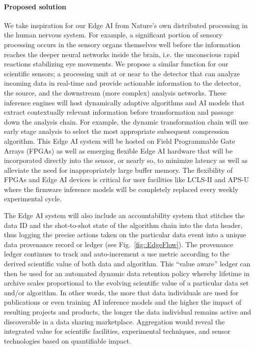 \documentclass{article}
\begin{document}
\paragraph{Proposed solution}%
We take inspiration for our Edge AI from Nature's own distributed processing in the human nervous system.
For example, a significant portion of sensory processing occurs in the sensory organs themselves well before the information reaches the deeper neural networks inside the brain, i.e. the unconscious rapid reactions stabilizing eye movements.
We propose a similar function for our scientific sensors; a processing unit at or near to the detector that can analyze incoming data in real-time and provide actionable information to the detector, the source, and the downstream (more complex) analysis networks.
These inference engines will host dynamically adaptive algorithms and AI models that extract contextually relevant information before transformation and passage down the analysis chain.
For example, the dynamic transformation chain will use early stage analysis to select the most appropriate subsequent compression algorithm.
This Edge AI system will be hosted on Field Programmable Gate Arrays (FPGAs) as well as emerging flexible Edge AI hardware \cite{edgetpu_benchmarks,edgetpu,waveCGRA,CGRAreview,seaofcores} that will be incorporated directly into the sensor, or nearly so, to minimize latency as well as alleviate the need for inappropriately large buffer memory.
The flexibility of FPGAs and Edge AI devices is critical for user facilities like LCLS-II and APS-U where the firmware inference models will be completely replaced every weekly experimental cycle.

The Edge AI system will also include an accountability system that stitches the data ID and the shot-to-shot state of the algorithm chain into the data header, thus logging the precise actions taken on the particular data event into a unique data provenance record or ledger (see Fig.~\ref{fig::EdgeFlow}).
The provenance ledger continues to track and auto-increment a use metric according to the derived scientific value of both data and algorithm.
This ``value aware'' ledger can then be used for an automated dynamic data retention policy whereby lifetime in archive scales proportional to the evolving scientific value of a particular data set and/or algorithm.
In other words, the more that data individuals are used for publications or even training AI inference models and the higher the impact of resulting projects and products, the longer the data individual remains active and discoverable in a data sharing marketplace. 
Aggregation would reveal the integrated value for scientific facilities, experimental techniques, and sensor technologies based on quantifiable impact.
\end{document}
